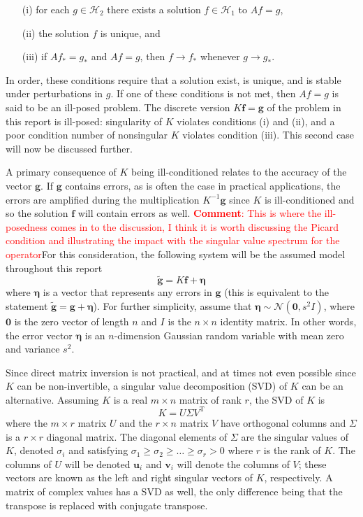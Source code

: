 \documentclass[12pt]{article}
\newcommand{\gdis}{\mathbf{g}}
\newcommand{\gnoise}{\widetilde{\mathbf{g}}}
\newcommand{\kmat}{K}	%
\newcommand{\fdis}{\mathbf{f}}
\newcommand{\trans}{\mathrm{T}}	%
\newcommand{\SD}{s}	%
\newcommand{\noise}{\bm{\eta}}	%
\newcommand{\singular}{\sigma}	%
\newcommand{\LSV}{\mathbf{u}}	%
\newcommand{\RSV}{\mathbf{v}}	%
\newcommand{\comment}[1]{\textcolor{red}{ \textbf{Comment}: #1}}
\begin{document}
\begin{enumerate}
\item[(i)] for each $g \in \mathcal{H}_2$ there exists a solution $f \in \mathcal{H}_1$ to $Af = g$,
\item[(ii)] the solution $f$ is unique, and
\item[(iii)] if $Af_* = g_*$ and $Af = g$, then $f \rightarrow f_*$ whenever $g \rightarrow g_*$.
\end{enumerate}
In order, these conditions require that a solution exist, is unique, and is stable under perturbations in $g$. If one of these conditions is not met, then $Af = g$ is said to be an ill-posed problem. The discrete version $\kmat\fdis = \gdis$ of the problem in this report is ill-posed: singularity of $\kmat$ violates conditions (i) and (ii), and a poor condition number of nonsingular $\kmat$ violates condition (iii). This second case will now be discussed further.  \par 
A primary consequence of $\kmat$ being ill-conditioned relates to the accuracy of the vector $\gdis$. If $\gdis$ contains errors, as is often the case in practical applications, the errors are amplified during the multiplication $\kmat^{-1}\gdis$ since $\kmat$ is ill-conditioned and so the solution $\fdis$ will contain errors as well. \comment{This is where the ill-posedness comes in to the discussion, I think it is worth discussing the Picard condition and illustrating the impact with the singular value spectrum for the operator}For this consideration, the following system will be the assumed model throughout this report
\begin{equation}
\gnoise = \kmat\fdis + \noise
\label{Eq_DisNoise}
\end{equation}
where $\noise$ is a vector that represents any errors in $\gdis$ (this is equivalent to the statement $\gnoise = \gdis + \noise$). For further simplicity, assume that $\noise \sim \mathcal{N}(\bm{0},\SD^2I)$, where $\bm{0}$ is the zero vector of length $n$ and $I$ is the $n \times n$ identity matrix. In other words, the error vector $\noise$ is an $n$-dimension Gaussian random variable with mean zero and variance $\SD^2$. \par
Since direct matrix inversion is not practical, and at times not even possible since $\kmat$ can be non-invertible, a singular value decomposition (SVD) of $\kmat$ can be an alternative. Assuming $\kmat$ is a real $m \times n$ matrix of rank $r$, the SVD of $\kmat$ is
\[\kmat = U\Sigma{V^\trans}\]
where the $m \times r$ matrix $U$ and the $r \times n$ matrix $V$ have orthogonal columns and $\Sigma$ is a $r \times r$ diagonal matrix. The diagonal elements of $\Sigma$ are the singular values of $\kmat$, denoted $\singular_i$ and satisfying $\singular_1 \geq \singular_2 \geq \ldots \geq \singular_r > 0$ where $r$ is the rank of $\kmat$. The columns of $U$ will be denoted $\LSV_i$ and $\RSV_i$ will denote the columns of $V$; these vectors are known as the left and right singular vectors of $\kmat$, respectively. A matrix of complex values has a SVD as well, the only difference being that the transpose is replaced with conjugate transpose. \par
\end{document}
